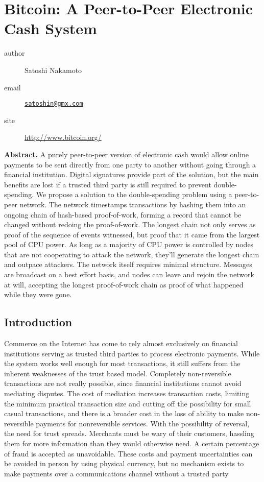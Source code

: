 \section{Bitcoin: A Peer-to-Peer Electronic Cash
System}\label{bitcoin-a-peer-to-peer-electronic-cash-system}

\begin{description}
\item[author]
Satoshi Nakamoto
\item[email]
\href{mailto:satoshin@gmx.com}{\nolinkurl{satoshin@gmx.com}}
\item[site]
\url{http://www.bitcoin.org/}
\end{description}

\textbf{Abstract.} A purely peer-to-peer version of electronic cash
would allow online payments to be sent directly from one party to
another without going through a financial institution. Digital
signatures provide part of the solution, but the main benefits are lost
if a trusted third party is still required to prevent double-spending.
We propose a solution to the double-spending problem using a
peer-to-peer network. The network timestamps transactions by hashing
them into an ongoing chain of hash-based proof-of-work, forming a record
that cannot be changed without redoing the proof-of-work. The longest
chain not only serves as proof of the sequence of events witnessed, but
proof that it came from the largest pool of CPU power. As long as a
majority of CPU power is controlled by nodes that are not cooperating to
attack the network, they'll generate the longest chain and outpace
attackers. The network itself requires minimal structure. Messages are
broadcast on a best effort basis, and nodes can leave and rejoin the
network at will, accepting the longest proof-of-work chain as proof of
what happened while they were gone.

\subsection{Introduction}\label{introduction}

Commerce on the Internet has come to rely almost exclusively on
financial institutions serving as trusted third parties to process
electronic payments. While the system works well enough for most
transactions, it still suffers from the inherent weaknesses of the trust
based model. Completely non-reversible transactions are not really
possible, since financial institutions cannot avoid mediating disputes.
The cost of mediation increases transaction costs, limiting the minimum
practical transaction size and cutting off the possibility for small
casual transactions, and there is a broader cost in the loss of ability
to make non-reversible payments for nonreversible services. With the
possibility of reversal, the need for trust spreads. Merchants must be
wary of their customers, hassling them for more information than they
would otherwise need. A certain percentage of fraud is accepted as
unavoidable. These costs and payment uncertainties can be avoided in
person by using physical currency, but no mechanism exists to make
payments over a communications channel without a trusted party

